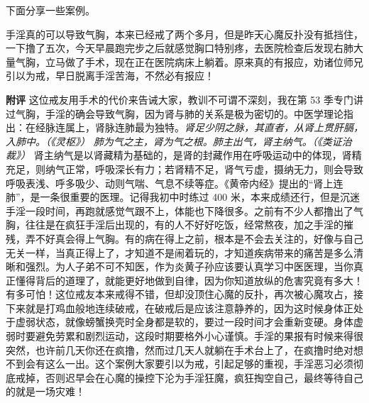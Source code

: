 下面分享一些案例。

\begin{case}
    手淫真的可以导致气胸，本来已经戒了两个多月，但是昨天心魔反扑没有抵挡住，一下撸了五次，今天早晨跑完步之后就感觉胸口特别疼，去医院检查后发现右肺大量气胸，立马做了手术，现在正在医院病床上躺着。原来真的有报应，劝诸位师兄引以为戒，早日脱离手淫苦海，不然必有报应！

    \textbf{附评} 这位戒友用手术的代价来告诫大家，教训不可谓不深刻，我在第 53 季专门讲过气胸，手淫的确会导致气胸，因为肾与肺的关系是极为密切的。中医学理论指出：在经脉连属上，肾脉连肺最为独特。\textit{肾足少阴之脉，其直者，从肾上贯肝膈，入肺中。（《灵枢》）} \textit{肺为气之主，肾为气之根。肺主出气，肾主纳气。（《类证治裁》）} 肾主纳气是以肾藏精为基础的，是肾的封藏作用在呼吸运动中的体现，肾精充足，则纳气正常，呼吸深长有力；若肾精不足，肾气亏虚，摄纳无力，则会导致呼吸表浅、呼多吸少、动则气喘、气息不续等症。《黄帝内经》提出的“肾上连肺”，是一条很重要的医理。记得我初中时练过 400 米，本来成绩还行，但是沉迷手淫一段时间，再跑就感觉气跟不上，体能也下降很多。之前有不少人都撸出了气胸，往往是在疯狂手淫后出现的，有的人不好好吃饭，经常熬夜，加之手淫的摧残，弄不好真会得上气胸。有的病在得上之前，根本是不会去关注的，好像与自己无关一样，当真正得上了，才知道不是闹着玩的，才知道疾病带来的痛苦是多么清晰和强烈。为人子弟不可不知医，作为炎黄子孙应该要认真学习中医医理，当你真正懂得背后的道理了，就能更好地做到自律，因为你知道放纵的危害究竟有多大！有多可怕！这位戒友本来戒得不错，但却没顶住心魔的反扑，再次被心魔攻占，接下来就是打鸡血般地连续破戒，在破戒后是应该注意静养的，因为这时候身体正处于虚弱状态，就像螃蟹换壳时全身都是软的，要过一段时间才会重新变硬。身体虚弱时要避免劳累和剧烈运动，这段时期要格外小心谨慎。手淫的果报有时候来得很突然，也许前几天你还在疯撸，然而过几天人就躺在手术台上了，在疯撸时绝对想不到会有这么一出。这个案例大家要引以为戒，引起足够的重视，手淫恶习必须彻底戒掉，否则迟早会在心魔的操控下沦为手淫狂魔，疯狂掏空自己，最终等待自己的就是一场灾难！
\end{case}

